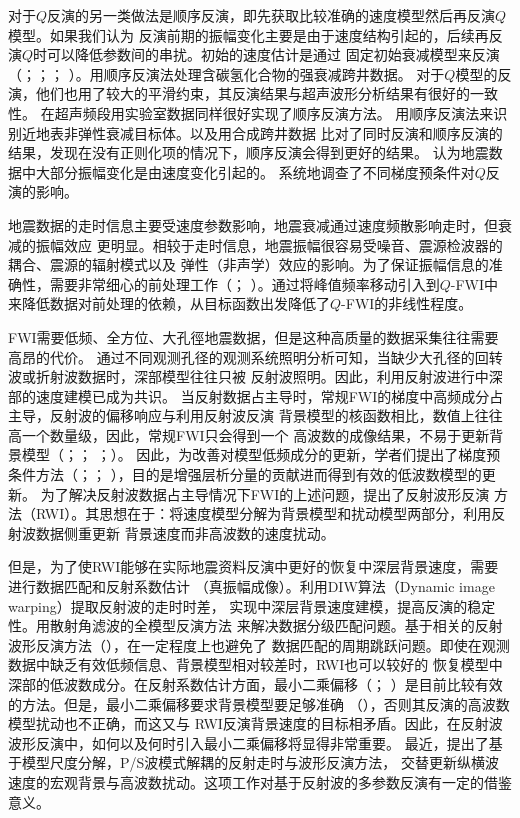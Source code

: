 对于$Q$反演的另一类做法是顺序反演，即先获取比较准确的速度模型然后再反演$Q$模型。如果我们认为
反演前期的振幅变化主要是由于速度结构引起的，后续再反演$Q$时可以降低参数间的串扰。初始的速度估计是通过
固定初始衰减模型来反演（；；；
）。用顺序反演法处理含碳氢化合物的强衰减跨井数据。
对于$Q$模型的反演，他们也用了较大的平滑约束，其反演结果与超声波形分析结果有很好的一致性。
在超声频段用实验室数据同样很好实现了顺序反演方法。
用顺序反演法来识别近地表非弹性衰减目标体。以及用合成跨井数据
比对了同时反演和顺序反演的结果，发现在没有正则化项的情况下，顺序反演会得到更好的结果。
认为地震数据中大部分振幅变化是由速度变化引起的。
系统地调查了不同梯度预条件对$Q$反演的影响。

地震数据的走时信息主要受速度参数影响，地震衰减通过速度频散影响走时，但衰减的振幅效应
更明显。相较于走时信息，地震振幅很容易受噪音、震源检波器的耦合、震源的辐射模式以及
弹性（非声学）效应的影响。为了保证振幅信息的准确性，需要非常细心的前处理工作（；
）。通过将峰值频率移动引入到$Q$-FWI中
来降低数据对前处理的依赖，从目标函数出发降低了$Q$-FWI的非线性程度。

FWI需要低频、全方位、大孔徑地震数据，但是这种高质量的数据采集往往需要高昂的代价。
通过不同观测孔径的观测系统照明分析可知，当缺少大孔径的回转波或折射波数据时，深部模型往往只被
反射波照明。因此，利用反射波进行中深部的速度建模已成为共识。
当反射数据占主导时，常规FWI的梯度中高频成分占主导，反射波的偏移响应与利用反射波反演
背景模型的核函数相比，数值上往往高一个数量级，因此，常规FWI只会得到一个
高波数的成像结果，不易于更新背景模型（；；
；）。
因此，为改善对模型低频成分的更新，学者们提出了梯度预条件方法（；；
），目的是增强层析分量的贡献进而得到有效的低波数模型的更新。
为了解决反射波数据占主导情况下FWI的上述问题，提出了反射波形反演
方法（RWI）。其思想在于：将速度模型分解为背景模型和扰动模型两部分，利用反射波数据侧重更新
背景速度而非高波数的速度扰动。

但是，为了使RWI能够在实际地震资料反演中更好的恢复中深层背景速度，需要进行数据匹配和反射系数估计
（真振幅成像）。利用DIW算法（Dynamic image warping）提取反射波的走时时差，
实现中深层背景速度建模，提高反演的稳定性。用散射角滤波的全模型反演方法
来解决数据分级匹配问题。基于相关的反射波形反演方法（），在一定程度上也避免了
数据匹配的周期跳跃问题。即使在观测数据中缺乏有效低频信息、背景模型相对较差时，RWI也可以较好的
恢复模型中深部的低波数成分。在反射系数估计方面，最小二乘偏移（；
）是目前比较有效的方法。但是，最小二乘偏移要求背景模型要足够准确
（），否则其反演的高波数模型扰动也不正确，而这又与
RWI反演背景速度的目标相矛盾。因此，在反射波波形反演中，如何以及何时引入最小二乘偏移将显得非常重要。
最近，提出了基于模型尺度分解，P/S波模式解耦的反射走时与波形反演方法，
交替更新纵横波速度的宏观背景与高波数扰动。这项工作对基于反射波的多参数反演有一定的借鉴意义。

